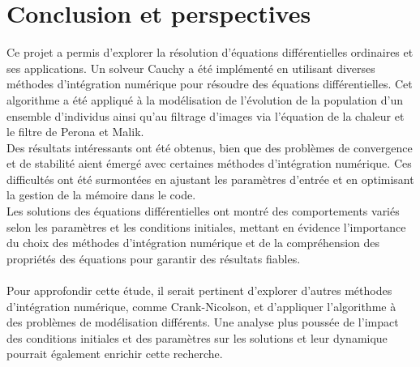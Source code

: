 \documentclass{article}
\begin{document}
\section{Conclusion et perspectives}
Ce projet a permis d'explorer la résolution d'équations différentielles ordinaires et ses applications. Un solveur Cauchy a été implémenté en utilisant diverses méthodes d'intégration numérique pour résoudre des équations différentielles. Cet algorithme a été appliqué à la modélisation de l'évolution de la population d'un ensemble d'individus ainsi qu'au filtrage d'images via l'équation de la chaleur et le filtre de Perona et Malik.\\
Des résultats intéressants ont été obtenus, bien que des problèmes de convergence et de stabilité aient émergé avec certaines méthodes d'intégration numérique. Ces difficultés ont été surmontées en ajustant les paramètres d'entrée et en optimisant la gestion de la mémoire dans le code.\\
Les solutions des équations différentielles ont montré des comportements variés selon les paramètres et les conditions initiales, mettant en évidence l'importance du choix des méthodes d'intégration numérique et de la compréhension des propriétés des équations pour garantir des résultats fiables.\\ \\
Pour approfondir cette étude, il serait pertinent d'explorer d'autres méthodes d'intégration numérique, comme Crank-Nicolson, et d'appliquer l'algorithme à des problèmes de modélisation différents. Une analyse plus poussée de l'impact des conditions initiales et des paramètres sur les solutions et leur dynamique pourrait également enrichir cette recherche.\\


\printbibliography
\end{document}
